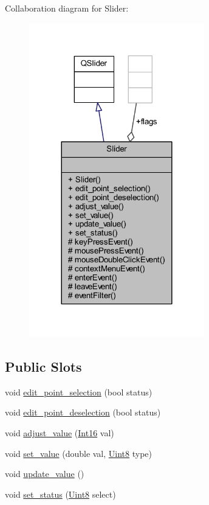 Collaboration diagram for Slider\+:
\nopagebreak
\begin{figure}[H]
\begin{center}
\leavevmode
\includegraphics[width=216pt]{d3/d2f/a00562}
\end{center}
\end{figure}
\subsection*{Public Slots}
\begin{DoxyCompactItemize}
\item 
void \hyperlink{a00077_adeebaace74ff3add2acd9147e96fc0a6}{edit\+\_\+point\+\_\+selection} (bool status)
\item 
void \hyperlink{a00077_a105dff1f3ae7cfdcfabacd013428a501}{edit\+\_\+point\+\_\+deselection} (bool status)
\item 
void \hyperlink{a00077_a521ac5143857dd652a0bafa77389fa81}{adjust\+\_\+value} (\hyperlink{a00004_a3985266aecb120f269789241c170850c}{Int16} val)
\item 
void \hyperlink{a00077_ae3010d3de02715db2f443560d7d2a27b}{set\+\_\+value} (double val, \hyperlink{a00004_a979e3e23b9a449e69ab6a8a83b6042f8}{Uint8} type)
\item 
void \hyperlink{a00077_a4f62a01554ee8d975abe0cb136937695}{update\+\_\+value} ()
\item 
void \hyperlink{a00077_a567902754e43310fe921b74c9d1862dd}{set\+\_\+status} (\hyperlink{a00004_a979e3e23b9a449e69ab6a8a83b6042f8}{Uint8} select)
\end{DoxyCompactItemize}
